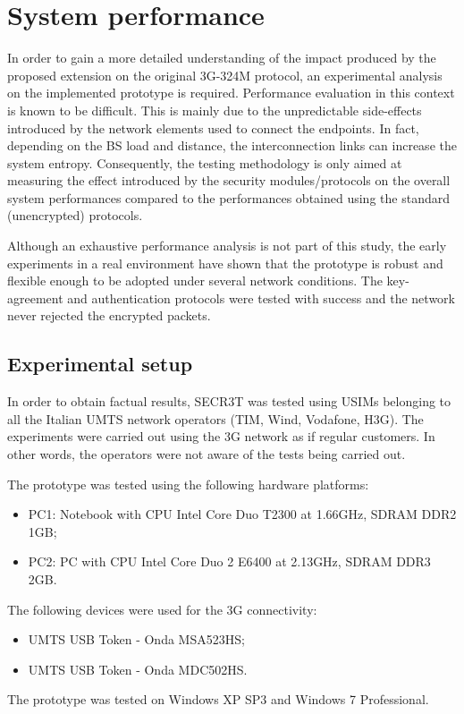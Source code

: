 \documentclass[10pt, conference, compsocconf]{IEEEtran}
\begin{document}


\section{System performance}
\label{par:perf}
In order to gain a more detailed understanding of the impact produced by the proposed extension on the original 3G-324M protocol, an experimental analysis on the implemented prototype is required. Performance evaluation in this context is known to be difficult. This is mainly due to the unpredictable side-effects introduced by the network elements used to connect the endpoints. In fact, depending on the BS load and distance, the interconnection links can increase the system entropy. Consequently, the testing methodology is only aimed at measuring the effect introduced by the security modules/protocols on the overall system performances compared to the performances obtained using the standard (unencrypted) protocols.

Although an exhaustive performance analysis is not part of this study, the early experiments in a real environment have shown that the prototype is robust and flexible enough to be adopted under several network conditions. The key-agreement and authentication protocols were tested with success and the network never rejected the encrypted packets.

\subsection{Experimental setup}

In order to obtain factual results, SECR3T was tested using USIMs belonging to all the Italian UMTS network operators (TIM, Wind, Vodafone, H3G). The experiments were carried out using the 3G network as if regular customers. In other words, the operators were not aware of the tests being carried out.

The prototype was tested using the following hardware platforms:
\begin{itemize}
  \item PC1: Notebook with CPU Intel Core Duo T2300 at 1.66GHz, SDRAM DDR2 1GB;
  \item PC2: PC with CPU Intel Core Duo 2 E6400 at 2.13GHz, SDRAM DDR3 2GB.
\end{itemize}
The following devices were used for the 3G connectivity:
\begin{itemize}
  \item UMTS USB Token - Onda MSA523HS;
  \item UMTS USB Token - Onda MDC502HS.
\end{itemize}
The prototype was tested on Windows XP SP3 and Windows 7 Professional.
\end{document}
